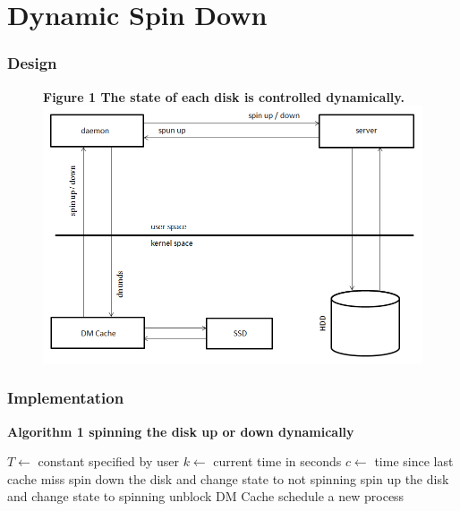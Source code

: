 \documentclass{beamer}
\begin{document}
\section{Dynamic Spin Down}
%
\begin{frame}
    \frametitle{Design}
    \begin{figure}
	\bf Figure 1 \rm The state of each disk is controlled dynamically.
	\centering \includegraphics[scale=.43]{drawing.png}
	\label{fig:struct}
    \end{figure}
\end{frame}
\begin{frame}
    \frametitle{Implementation}
    \bf Algorithm 1 \rm spinning the disk up or down dynamically \\
    \algrenewcommand{}
    \begin{algorithmic}[1]
	\State $T\gets$ constant specified by user
		\State $k\gets$ current time in seconds
		\State $c\gets$ time since last cache miss
		    \State spin down the disk and change state to not spinning
		\EndIf
	    \Else {}
		    \State spin up the disk and change state to spinning
		    \State unblock DM Cache
		\EndIf
	    \EndIf
	    \State schedule a new process
	\EndWhile
	\EndProcedure
    \end{algorithmic}
\end{frame}
%
\end{document}
